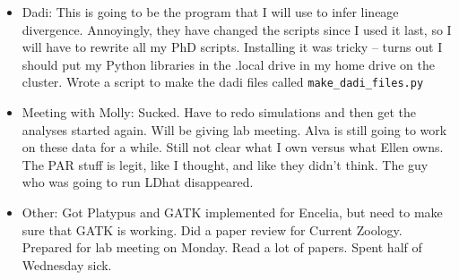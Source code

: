 \documentclass[idxtotoc,hyperref,openany,oneside]{labbook} %
\begin{document}
\begin{itemize}
\item Dadi: This is going to be the program that I will use to infer lineage divergence. Annoyingly, they have changed the scripts since I used it last, so I will have to rewrite all my PhD scripts. Installing it was tricky -- turns out I should put my Python libraries in the .local drive in my home drive on the cluster. Wrote a script to make the dadi files called \verb+make_dadi_files.py+
\item Meeting with Molly: Sucked. Have to redo simulations and then get the analyses started again. Will be giving lab meeting. Alva is still going to work on these data for a while. Still not clear what I own versus what Ellen owns. The PAR stuff is legit, like I thought, and like they didn't think. The guy who was going to run LDhat disappeared.
\item Other: Got Platypus and GATK implemented for Encelia, but need to make sure that GATK is working. Did a paper review for Current Zoology. Prepared for lab meeting on Monday. Read a lot of papers. Spent half of Wednesday sick.
\end{itemize}
\end{document}
